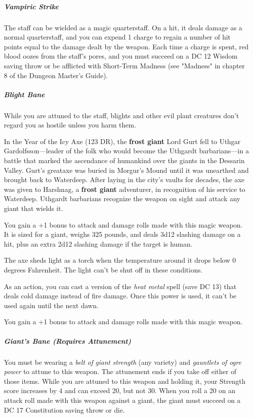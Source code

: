 \documentclass[10pt,a4paper,twoside,bg=print,twocolumn,openany,nodeprecatedcode]{dndbook}
\begin{document}
\subparagraph{Vampiric Strike}
The staff can be wielded as a magic quarterstaff. On a hit, it deals damage as a normal quarterstaff, and you can expend 1 charge to regain a number of hit points equal to the damage dealt by the weapon. Each time a charge is spent, red blood oozes from the staff's pores, and you must succeed on a DC 12 Wisdom saving throw or be afflicted with Short-Term Madness (see "Madness" in chapter 8 of the Dungeon Master's Guide).

\subparagraph{Blight Bane}
While you are attuned to the staff, blights and other evil plant creatures don't regard you as hostile unless you harm them.

In the Year of the Icy Axe (123 DR), the \textbf{frost giant} Lord Gurt fell to Uthgar Gardolfsson—leader of the folk who would become the Uthgardt barbarians—in a battle that marked the ascendance of humankind over the giants in the Dessarin Valley. Gurt's greataxe was buried in Morgur's Mound until it was unearthed and brought back to Waterdeep. After laying in the city's vaults for decades, the axe was given to Harshnag, a \textbf{frost giant} adventurer, in recognition of his service to Waterdeep. Uthgardt barbarians recognize the weapon on sight and attack any giant that wields it.

You gain a +1 bonus to attack and damage rolls made with this magic weapon. It is sized for a giant, weighs 325 pounds, and deals 3d12 slashing damage on a hit, plus an extra 2d12 slashing damage if the target is human.

The axe sheds light as a torch when the temperature around it drops below 0 degrees Fahrenheit. The light can't be shut off in these conditions.

As an action, you can cast a version of the \textit{heat metal} spell (save DC 13) that deals cold damage instead of fire damage. Once this power is used, it can't be used again until the next dawn.

You gain a +1 bonus to attack and damage rolls made with this magic weapon.

\subparagraph{Giant's Bane (Requires Attunement)}
You must be wearing a \textit{belt of giant strength} (any variety) and \textit{gauntlets of ogre power} to attune to this weapon. The attunement ends if you take off either of those items. While you are attuned to this weapon and holding it, your Strength score increases by 4 and can exceed 20, but not 30. When you roll a 20 on an attack roll made with this weapon against a giant, the giant must succeed on a DC 17 Constitution saving throw or die.
\end{document}
